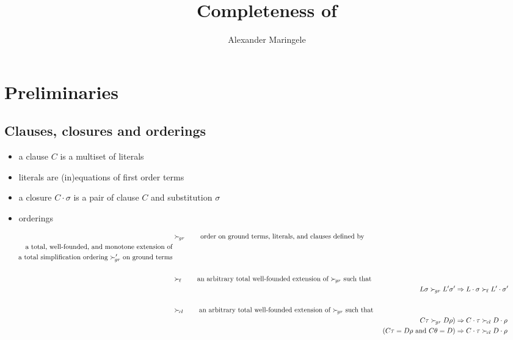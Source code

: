 \documentclass[%
]{beamer}
\title[Completeness]{Completeness of }
\author[{A$\ell$M}]{%
	Alexander Maringele
}
\institute[UIBK]{%
	{alexander.maringele@gmail.com}
}
\begin{document}
\titleframe

\begin{frame}
    \nocite{GK2004csl}
    
    
\end{frame}


\section{Preliminaries}

\subsection{Clauses, closures and orderings}

\begin{frame}

    \begin{itemize}
        \item a clause $C$ is a multiset of literals
        \item literals are (in)equations of first order terms
        \item a closure $C\cdot\sigma$ is a pair of clause $C$ and substitution $\sigma$
        \item orderings
    \end{itemize}
    \begin{align*}
        &\succG
        \tag*{order on ground terms, literals, and clauses defined by}
        \\
        \tag*{a total, well-founded, and monotone extension of}
        \\
        \tag*{a total simplification ordering $\succG'$ on ground terms}
        \\
        \\
        &\succL
        \tag*{an arbitrary total well-founded extension of $\succG$ such that}
        \\
        && L\sigma\succG L'\sigma' &\Rightarrow L\cdot\sigma\succL L'\cdot\sigma'\tag*{}
        \\
        \\
        &\succC \tag*{an arbitrary total well-founded extension of $\succG$ such that }
        \\
        && C\tau\succG D\rho\text)
        &\Rightarrow C\cdot\tau\succC D\cdot\rho   \tag*{}
        \\
        && (C\tau=D\rho\text{ and }C\theta = D)
        &\Rightarrow C\cdot\tau\succC D\cdot\rho   \tag*{}
    \end{align*}
\end{frame}
\end{document}
